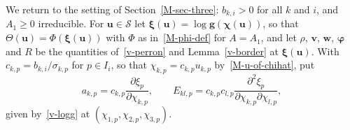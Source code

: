 \documentclass[11pt]{article}
\theoremstyle{plain}
\theoremstyle{remark}
\numberwithin{equation}{section}
\begin{document}
We return to the setting of Section~\ref{M-sec-three}: $b_{k,i}>0$ for all $k$
and $i$, and $A_1\ge 0$ irreducible. For $\bm u\in\mathcal{S}$ let
$\bm\xi(\bm u)=\log\bm g\left(\bm\chi(\bm u)\right)$, so that
$\Theta(\bm u)=\Phi\left(\bm\xi(\bm u)\right)$ with $\Phi$ as
in~\eqref{M-phi-def} for $A=A_1$, and let $\rho$, $\bm v$, $\bm w$,
$\bm\varphi$ and $R$ be the quantities of~\eqref{v-perron}
and Lemma~\ref{v-border} at $\bm\xi(\bm u)$. With
$c_{k,p}=b_{k,i}/\sigma_{k,p}$ for $p\in I_i$, so that
$\chi_{k,p}=c_{k,p}u_{k,p}$ by~\eqref{M-u-of-chihat}, put
\begin{equation}\label{v-a}
a_{k,p}=c_{k,p}\frac{\partial\xi_p}{\partial\chi_{k,p}},\qquad
E_{kl,p}=c_{k,p}c_{l,p}\frac{\partial^2\xi_p}{\partial\chi_{k,p}\partial\chi_{l,p}},
\end{equation}
given by~\eqref{v-logg} at $\left(\chi_{1,p},\chi_{2,p},\chi_{3,p}\right)$.
\end{document}
